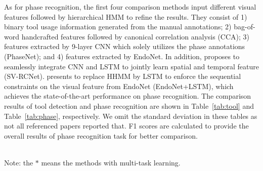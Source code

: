 \documentclass{elsarticle}
\begin{document}
As for phase recognition, the first four comparison methods input different visual features followed by hierarchical HMM to refine the results.
They consist of 1) binary tool usage information generated from the manual annotations;
2) bag-of-word handcrafted features followed by canonical correlation analysis (CCA);
3) features extracted by 9-layer CNN which solely utilizes the phase annotations (PhaseNet); and
4) features extracted by EndoNet.
In addition, \cite{jin2018sv} proposes to seamlessly integrate CNN and LSTM to jointly learn spatial and temporal feature (SV-RCNet).
\cite{twinanda2017vision} presents to replace HHMM by LSTM to enforce the sequential constraints on the visual feature from EndoNet (EndoNet+LSTM), which achieves the state-of-the-art performance on phase recognition.
The comparison results of tool detection and phase recognition are shown in Table~\ref{tab:tool} and Table~\ref{tab:phase}, respectively.
We omit the standard deviation in these tables as not all referenced papers reported that.
F1 scores are calculated to provide the overall results of phase recognition task for better comparison.


\begin{table}[t]
\centering
	\caption{Average precisions for recognizing the seven tools (rows) using different approaches (2nd to 5th columns).}
	\vspace{-2mm}
	\label{tab:tool}
		\\
		\vspace{0.5mm}
		\scriptsize Note: the $\ast$ means the methods with multi-task learning.	~~~~~~~~			
\end{table}
	
\end{document}
